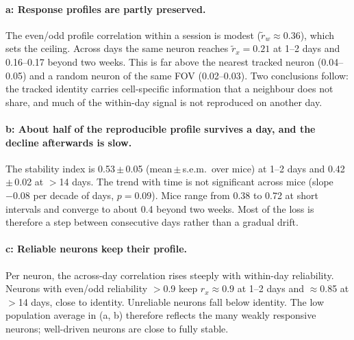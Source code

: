 \documentclass[10pt,a4paper]{article}
\begin{document}
\paragraph{a: Response profiles are partly preserved.}
The even/odd profile correlation within a session is modest ($\tilde r_w\approx0.36$), which sets the ceiling.
Across days the same neuron reaches $\tilde r_x=0.21$ at 1--2 days and 0.16--0.17 beyond two weeks.
This is far above the nearest tracked neuron (0.04--0.05) and a random neuron of the same FOV (0.02--0.03).
Two conclusions follow: the tracked identity carries cell-specific information that a neighbour does not share, and much of the within-day signal is not reproduced on another day.

\paragraph{b: About half of the reproducible profile survives a day, and the decline afterwards is slow.}
The stability index is 0.53\,$\pm$\,0.05 (mean\,$\pm$\,s.e.m.\ over mice) at 1--2 days and 0.42\,$\pm$\,0.02 at $>$14 days.
The trend with time is not significant across mice (slope $-0.08$ per decade of days, $p=0.09$).
Mice range from 0.38 to 0.72 at short intervals and converge to about 0.4 beyond two weeks.
Most of the loss is therefore a step between consecutive days rather than a gradual drift.

\paragraph{c: Reliable neurons keep their profile.}
Per neuron, the across-day correlation rises steeply with within-day reliability.
Neurons with even/odd reliability $>$0.9 keep $r_x\approx0.9$ at 1--2 days and $\approx$0.85 at $>$14 days, close to identity.
Unreliable neurons fall below identity.
The low population average in (a, b) therefore reflects the many weakly responsive neurons; well-driven neurons are close to fully stable.
\end{document}
